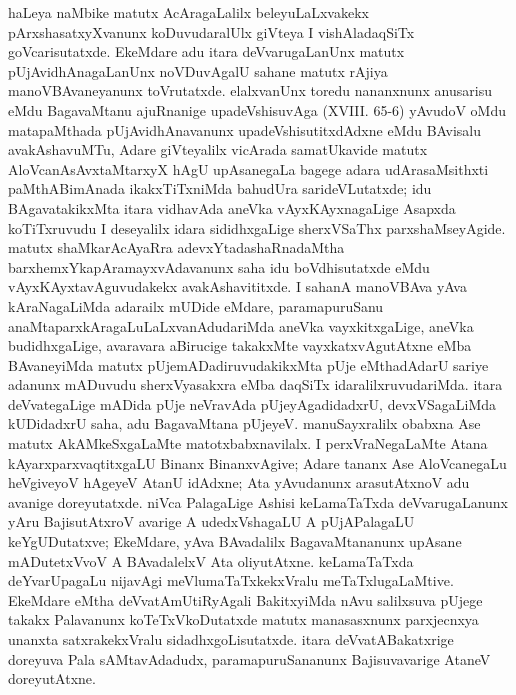 haLeya naMbike matutx AcAragaLalilx beleyuLaLxvakekx pArxshasatxyXvanunx koDuvudaralUlx giVteya I vishAladaqSiTx goVcarisutatxde. EkeMdare adu itara deVvarugaLanUnx matutx pUjAvidhAnagaLanUnx noVDuvAgalU sahane matutx rAjiya manoVBAvaneyanunx toVrutatxde. elalxvanUnx toredu nananxnunx anusarisu eMdu BagavaMtanu ajuRnanige upadeVshisuvAga {\rm(XVIII. 65-6)} yAvudoV oMdu matapaMthada pUjAvidhAnavanunx upadeVshisutitxdAdxne eMdu BAvisalu avakAshavuMTu, Adare giVteyalilx vicArada samatUkavide matutx AloVcanAsAvxtaMtarxyX hAgU upAsanegaLa bagege adara udArasaMsithxti paMthABimAnada ikakxTiTxniMda bahudUra sarideVLutatxde; idu BAgavatakikxMta itara vidhavAda aneVka vAyxKAyxnagaLige Asapxda koTiTxruvudu I deseyalilx idara sididhxgaLige sherxVSaThx parxshaMseyAgide. matutx shaMkarAcAyaRra adevxYtadashaRnadaMtha barxhemxYkapAramayxvAdavanunx saha idu boVdhisutatxde eMdu vAyxKAyxtavAguvudakekx avakAshavititxde. I sahanA manoVBAva yAva kAraNagaLiMda adarailx mUDide eMdare, paramapuruSanu anaMtaparxkAragaLuLaLxvanAdudariMda aneVka vayxkitxgaLige, aneVka budidhxgaLige, avaravara aBirucige takakxMte vayxkatxvAgutAtxne eMba BAvaneyiMda matutx pUjemADadiruvudakikxMta pUje eMthadAdarU sariye adanunx mADuvudu sherxVyasakxra eMba daqSiTx idaralilxruvudariMda. itara deVvategaLige mADida pUje neVravAda pUjeyAgadidadxrU, devxVSagaLiMda kUDidadxrU saha, adu BagavaMtana pUjeyeV. manuSayxralilx obabxna Ase matutx AkAMkeSxgaLaMte matotxbabxnavilalx. I perxVraNegaLaMte Atana kAyarxparxvaqtitxgaLU Binanx BinanxvAgive; Adare tananx Ase AloVcanegaLu heVgiveyoV hAgeyeV AtanU idAdxne; Ata yAvudanunx arasutAtxnoV adu avanige doreyutatxde. niVca PalagaLige Ashisi keLamaTaTxda deVvarugaLanunx yAru BajisutAtxroV avarige A udedxVshagaLU A pUjAPalagaLU keYgUDutatxve; EkeMdare, yAva BAvadalilx BagavaMtananunx upAsane mADutetxVvoV A BAvadalelxV Ata oliyutAtxne. keLamaTaTxda deYvarUpagaLu nijavAgi meVlumaTaTxkekxVralu meTaTxlugaLaMtive. EkeMdare eMtha deVvatAmUtiRyAgali BakitxyiMda nAvu salilxsuva pUjege takakx Palavanunx koTeTxVkoDutatxde matutx manasasxnunx parxjecnxya unanxta satxrakekxVralu sidadhxgoLisutatxde. itara deVvatABakatxrige doreyuva Pala sAMtavAdadudx, paramapuruSananunx Bajisuvavarige AtaneV doreyutAtxne.

